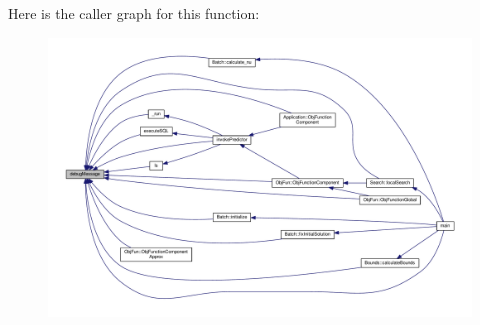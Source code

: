 Here is the caller graph for this function\-:\nopagebreak
\begin{figure}[H]
\begin{center}
\leavevmode
\includegraphics[width=350pt]{debugmessage_8hh_a7216d8ca989b1eaea79109c2a1236024_icgraph}
\end{center}
\end{figure}


